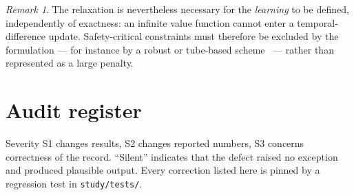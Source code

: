 \documentclass[11pt,a4paper,twoside,openright]{report}
\theoremstyle{plain}
\theoremstyle{definition}
\theoremstyle{remark}
\newtheorem{remark}[theorem]{Remark}
\begin{document}
	\begin{remark}
		The relaxation is nevertheless necessary for the \emph{learning} to be defined,
		independently of exactness: an infinite value function cannot enter a
		temporal-difference update. Safety-critical constraints must therefore be
		excluded by the formulation --- for instance by a robust or tube-based
		scheme~\cite{zanon2021safe} --- rather than represented as a large penalty.
	\end{remark}

	\chapter{Audit register}
	\label{app:audit}

	Severity S1 changes results, S2 changes reported numbers, S3 concerns
	correctness of the record. ``Silent'' indicates that the defect raised no
	exception and produced plausible output. Every correction listed here is pinned
	by a regression test in \texttt{study/tests/}.
\end{document}
